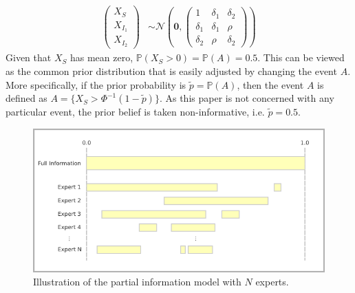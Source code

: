 \documentclass[11pt]{article}
\renewcommand{\P}{\mathbb{P}}
\theoremstyle{definition}
\theoremstyle{definition}
\begin{document}
\begin{align}
\left(\begin{matrix} X_S \\ X_{I_1}\\ X_{I_2} \end{matrix}\right) &\sim \mathcal{N}\left(
 \boldsymbol{0},  \left(\begin{matrix} 
1 & \delta_1 & \delta_2\\
\delta_1 & \delta_1 &\rho\\
\delta_2 & \rho & \delta_2
 \end{matrix}\right)\right) \label{twoExperts}
\end{align}
Given that $X_S$ has mean zero, $\P(X_S > 0) = \P(A) = 0.5$. This can be viewed as the common prior distribution that is easily adjusted by changing the event $A$. More specifically, if the prior probability is $\tilde{p} = \P(A)$, then the event $A$ is defined as $A = \{ X_S > \Phi^{-1}(1-\tilde{p}) \}$. As this paper is not concerned with any particular event, the prior belief is taken non-informative, i.e. $\tilde{p} = 0.5$.  

\begin{figure}[htbp]
   \includegraphics[width = \textwidth]{N=N} %
   \caption{Illustration of the partial information model with $N$ experts.}
   \label{diagramN}
\end{figure}
\end{document}
